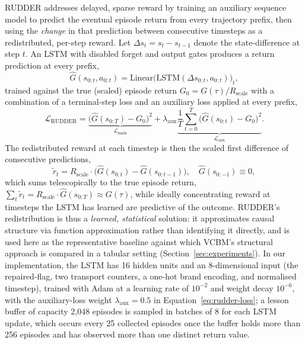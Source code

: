 \documentclass[conference]{IEEEtran}
\begin{document}
RUDDER \cite{b_arjonaibarra2019rudder} addresses delayed, sparse reward by training an auxiliary sequence model to predict the eventual episode return from every trajectory prefix, then using the \emph{change} in that prediction between consecutive timesteps as a redistributed, per-step reward. Let $\Delta s_t = s_t - s_{t-1}$ denote the state-difference at step $t$. An LSTM \cite{b_hochreiter1997lstm} with disabled forget and output gates produces a return prediction at every prefix,
\begin{equation}
  \hat{G}(s_{0:t}, a_{0:t}) = \mathrm{Linear}\big(\mathrm{LSTM}(\Delta s_{0:t}, a_{0:t})\big)_t ,
  \label{eq:rudder-lstm}
\end{equation}
trained against the true (scaled) episode return $G_0 = G(\tau) / R_{\mathrm{scale}}$ with a combination of a terminal-step loss and an auxiliary loss applied at every prefix,
\begin{equation}
  \mathcal{L}_{\mathrm{RUDDER}} = \underbrace{\big(\hat{G}(s_{0:T}) - G_0\big)^2}_{\mathcal{L}_{\mathrm{main}}} + \lambda_{\mathrm{aux}} \underbrace{\frac{1}{T}\sum_{t=0}^{T} \big(\hat{G}(s_{0:t}) - G_0\big)^2}_{\mathcal{L}_{\mathrm{aux}}} .
  \label{eq:rudder-loss}
\end{equation}
The redistributed reward at each timestep is then the scaled first difference of consecutive predictions,
\begin{equation}
  \tilde{r}_t = R_{\mathrm{scale}} \cdot \big(\hat{G}(s_{0:t}) - \hat{G}(s_{0:t-1})\big), \quad \hat{G}(s_{0:-1}) \equiv 0 ,
  \label{eq:rudder-redistribution}
\end{equation}
which sums telescopically to the true episode return, $\sum_t \tilde{r}_t = R_{\mathrm{scale}} \cdot \hat{G}(s_{0:T}) \approx G(\tau)$, while ideally concentrating reward at timesteps the LSTM has learned are predictive of the outcome. RUDDER's redistribution is thus a \emph{learned, statistical} solution: it approximates causal structure via function approximation rather than identifying it directly, and is used here as the representative baseline against which VCBM's structural approach is compared in a tabular setting (Section~\ref{sec:experiments}). In our implementation, the LSTM has 16 hidden units and an 8-dimensional input (the repaired-flag, two transport counters, a one-hot brand encoding, and normalised timestep), trained with Adam at a learning rate of $10^{-2}$ and weight decay $10^{-6}$, with the auxiliary-loss weight $\lambda_{\mathrm{aux}}=0.5$ in Equation~\eqref{eq:rudder-loss}; a lesson buffer of capacity 2{,}048 episodes is sampled in batches of 8 for each LSTM update, which occurs every 25 collected episodes once the buffer holds more than 256 episodes and has observed more than one distinct return value.
\end{document}
